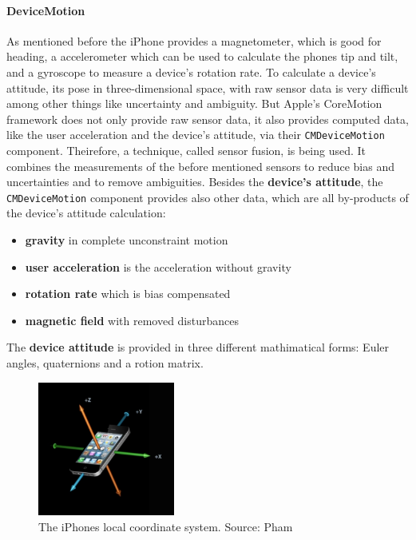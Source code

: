 \paragraph{DeviceMotion}

As mentioned before the iPhone provides a magnetometer, which is good for heading, a accelerometer which can be used to calculate the phones tip and tilt, and a gyroscope to measure a device's rotation rate.
To calculate a device's attitude, its pose in three-dimensional space, with raw sensor data is very difficult among other things like uncertainty and ambiguity.
But Apple's CoreMotion framework does not only provide raw sensor data, it also provides computed data, like the user acceleration and the device's attitude, via their \texttt{CMDeviceMotion} component.
Theirefore, a technique, called sensor fusion, is being used.
It combines the measurements of the before mentioned sensors to reduce bias and uncertainties and to remove ambiguities.
Besides the \textbf{device's attitude}, the \texttt{CMDeviceMotion} component provides also other data, which are all by-products of the device's attitude calculation:
\begin{itemize}
  \item \textbf{gravity} in complete unconstraint motion
  \item \textbf{user acceleration} is the acceleration without gravity
  \item \textbf{rotation rate} which is bias compensated
  \item \textbf{magnetic field} with removed disturbances
\end{itemize}

The \textbf{device attitude} is provided in three different mathimatical forms: Euler angles, quaternions and a rotion matrix.

\begin{center}
  \begin{figure}
    \includegraphics[width=0.4\textwidth]{figures/iphone_coordinatesystem}
    \caption{The iPhones local coordinate system. Source: Pham \cite{apple:wwdc_2012_pham}}
    \label{fig:iphone_cs}
  \end{figure}
\end{center}

